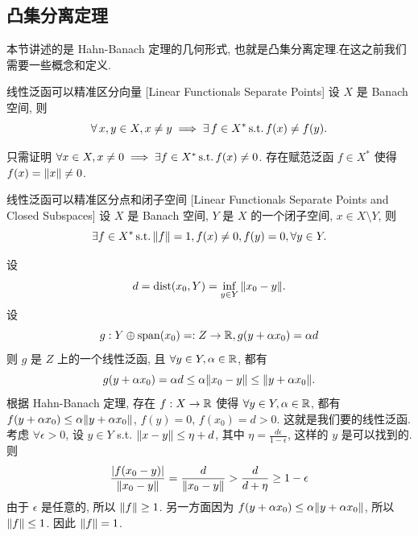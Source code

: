     \subsection{凸集分离定理}

        \begin{intrormk}
            [Dedicatia]
            本节讲述的是 Hahn-Banach 定理的几何形式, 也就是凸集分离定理.在这之前我们需要一些概念和定义.
        \end{intrormk}

        \begin{ppt}
            {线性泛函可以精准区分向量}
            [Linear Functionals Separate Points]
            设 \(X\) 是 Banach 空间, 则
            \[\forall\,x,y\in X, x\neq y\implies\exists\,f\in X^*\operatorname{\text{s.t.}} f(x)\neq f(y).\]
        \end{ppt}

        \begin{prf}
            只需证明 \(\forall x\in X, x\neq 0\implies\exists f\in X^*\operatorname{\text{s.t.}} f(x)\neq 0\). 存在赋范泛函 \(f\in X^*\) 使得 \(f(x)=\norm{x}\neq 0\).
        \end{prf}

        \begin{ppt}
            {线性泛函可以精准区分点和闭子空间}
            [Linear Functionals Separate Points and Closed Subspaces]
            设 \(X\) 是 Banach 空间, \(Y\) 是 \(X\) 的一个闭子空间, \(x\in X\setminus Y\), 则
            \[\exists f\in X^*\operatorname{\text{s.t.}} \norm{f}=1, f(x)\neq 0, f(y)=0, \forall y\in Y.\]
        \end{ppt}

        \begin{prf}
            设 
            \[d=\operatorname{dist}(x_0, Y)=\inf_{y\in Y}\norm{x_0-y}.\]
            设
            \[g:Y \oplus \operatorname{span} (x_0)=: Z \to \operatorname{\mathbb{R}}, g(y+\alpha x_0) = \alpha d\]
            则 \(g\) 是 \(Z\) 上的一个线性泛函, 且 \(\forall y\in Y, \alpha\in\operatorname{\mathbb{R}}\), 都有
            \[g(y+\alpha x_0)=\alpha d\leq \alpha\norm{x_0-y}\leq\norm{y+\alpha x_0}.\]
            根据 Hahn-Banach 定理, 存在 \(f:X\to\operatorname{\mathbb{R}}\) 使得 \(\forall y\in Y, \alpha\in\operatorname{\mathbb{R}}\), 都有 \(f(y+\alpha x_0)\leq\alpha\norm{y+\alpha x_0} \), \(f(y)=0\), \(f(x_0)=d>0\). 这就是我们要的线性泛函.\\
            考虑 \(\forall\epsilon>0\), 设 \(y\in Y\) s.t. \(\norm{x-y}\leq\eta+d\), 其中 \(\eta=\frac{d\epsilon}{1-\epsilon}\), 这样的 \(y\) 是可以找到的. 则
            \[\frac{|f(x_0-y)|}{\norm{x_0-y}}=\frac{d}{\norm{x_0-y}}>\frac{d}{d+\eta}\geq 1-\epsilon\] 
            由于 \(\epsilon\) 是任意的, 所以 \(\norm{f}\geq 1\). 另一方面因为 \(f(y+\alpha x_0)\leq\alpha\norm{y+\alpha x_0}\), 所以 \(\norm{f}\leq 1\). 因此 \(\norm{f}=1\).
        \end{prf}

